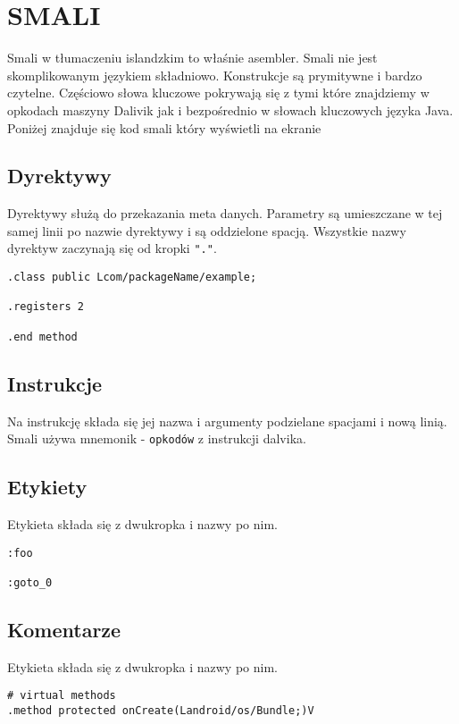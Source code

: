 \documentclass[12pt,a4paper,leqno,oneside,titlepage]{book}
\begin{document}
\section{SMALI}
\label{smali}
%
Smali w tłumaczeniu islandzkim to właśnie asembler\cite{SmaliWiki}. Smali nie jest skomplikowanym językiem składniowo. Konstrukcje są prymitywne i bardzo czytelne. Częściowo słowa kluczowe pokrywają się z tymi które znajdziemy w opkodach maszyny Dalivik jak i bezpośrednio w słowach kluczowych języka Java.  Poniżej znajduje się kod smali który wyświetli na ekranie 

% 
\subsection{Dyrektywy}
%
Dyrektywy służą do przekazania meta danych.
Parametry są umieszczane w tej samej linii po nazwie dyrektywy i są oddzielone spacją.
Wszystkie nazwy dyrektyw zaczynają się od kropki \verb|"."|.
%
\begin{lstlisting}[language=smali,captionpos=b, caption={Przykład składni dyrektyw}]
.class public Lcom/packageName/example;

.registers 2

.end method
\end{lstlisting}
%
\subsection{Instrukcje}
%
Na instrukcję składa się jej nazwa i argumenty podzielane spacjami i nową linią.
Smali używa mnemonik - \verb|opkodów| z instrukcji dalvika\cite{DalvikOpCodes}.
%
\subsection{Etykiety}
%
Etykieta składa się z dwukropka i nazwy po nim.
\begin{lstlisting}[language=smali,captionpos=b, caption={Przykład etykiet}]
:foo

:goto_0
\end{lstlisting}
%
\subsection{Komentarze}
%
%
Etykieta składa się z dwukropka i nazwy po nim.
\begin{lstlisting}[language=smali,captionpos=b, caption={Przykład komentarzy}]
# virtual methods
.method protected onCreate(Landroid/os/Bundle;)V
\end{lstlisting}
%
\end{document}
